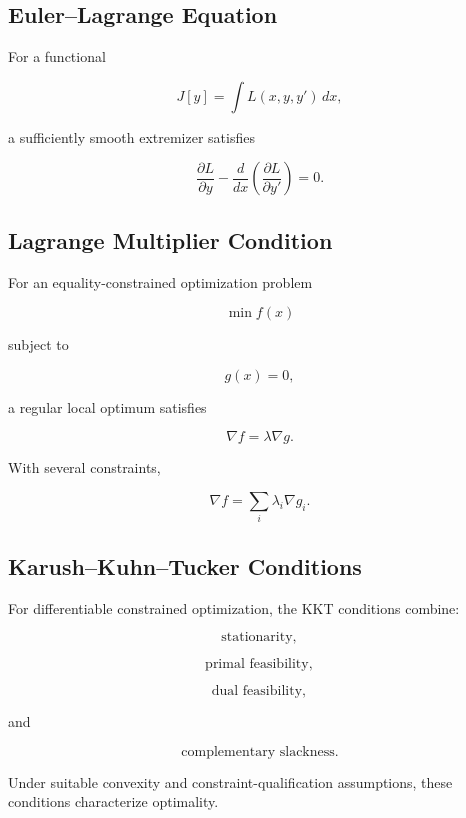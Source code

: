 \subsection{Euler--Lagrange Equation}
\label{subsec:euler-lagrange-summary}

For a functional

\[
J[y]
=
\int
L(x,y,y')
\,dx,
\]

a sufficiently smooth extremizer satisfies

\[
\boxed{
\frac{\partial L}{\partial y}
-
\frac{d}{dx}
\left(
\frac{\partial L}{\partial y'}
\right)
=
0.
}
\]

\subsection{Lagrange Multiplier Condition}
\label{subsec:lagrange-multiplier-summary}

For an equality-constrained optimization problem

\[
\min f(x)
\]

subject to

\[
g(x)=0,
\]

a regular local optimum satisfies

\[
\boxed{
\nabla f
=
\lambda\nabla g.
}
\]

With several constraints,

\[
\boxed{
\nabla f
=
\sum_i
\lambda_i
\nabla g_i.
}
\]

\subsection{Karush--Kuhn--Tucker Conditions}
\label{subsec:kkt-summary}

For differentiable constrained optimization, the KKT conditions combine:

\[
\boxed{
\text{stationarity},
}
\]

\[
\boxed{
\text{primal feasibility},
}
\]

\[
\boxed{
\text{dual feasibility},
}
\]

and

\[
\boxed{
\text{complementary slackness}.
}
\]

Under suitable convexity and constraint-qualification assumptions, these
conditions characterize optimality.

